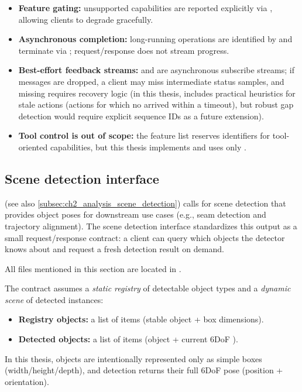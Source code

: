 \begin{itemize}
    \item \textbf{Feature gating:} unsupported capabilities are reported explicitly via , allowing clients to degrade gracefully.
    \item \textbf{Asynchronous completion:} long-running operations are identified by  and terminate via ; request/response does not stream progress.
    \item \textbf{Best-effort feedback streams:}  and  are asynchronous subscribe streams; if messages are dropped, a client may miss intermediate status samples, and missing  requires recovery logic (in this thesis,  includes practical heuristics for stale actions (actions for which no  arrived within a timeout), but robust gap detection would require explicit sequence IDs as a future extension).
    \item \textbf{Tool control is out of scope:} the feature list reserves identifiers for tool-oriented capabilities, but this thesis implements and uses only .
\end{itemize}





\subsection{Scene detection interface} \label{sec:ch3_scene_detection_interface}

 (see also \autoref{subsec:ch2_analysis_scene_detection}) calls for scene detection that provides object poses for downstream use cases (e.g., seam detection and trajectory alignment). The scene detection interface standardizes this output as a small request/response contract: a client can query which objects the detector knows about and request a fresh detection result on demand.

All files mentioned in this section are located in .

The contract assumes a \emph{static registry} of detectable object types and a \emph{dynamic scene} of detected instances:
\begin{itemize}
    \item \textbf{Registry objects:} a list of  items (stable object  + box dimensions).
    \item \textbf{Detected objects:} a list of  items (object  + current 6DoF ).
\end{itemize}
In this thesis, objects are intentionally represented only as simple boxes (width/height/depth), and detection returns their full 6DoF pose (position + orientation).

